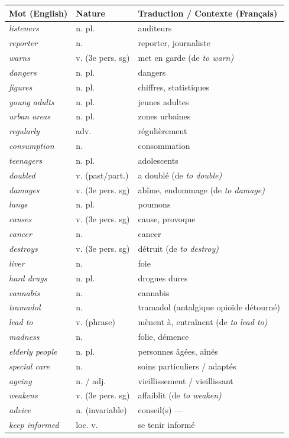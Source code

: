 \documentclass[11pt]{article}
\newcommand{\eng}[1]{\ifmmode\text{\textit{#1}}\else\begingroup\selectlanguage{english}\itshape #1\endgroup\fi}
\begin{document}
\begin{center}
\begin{tabularx}{\linewidth}{|l|l|X|}
\hline
\rowcolor{popblueL} \textbf{Mot (English)} & \textbf{Nature} & \textbf{Traduction / Contexte (Français)} \\
\hline
\eng{listeners} & n. pl. & auditeurs \\
\eng{reporter} & n. & reporter, journaliste \\
\eng{warns} & v. (3e pers. sg) & met en garde (de \eng{to warn}) \\
\eng{dangers} & n. pl. & dangers \\
\eng{figures} & n. pl. & chiffres, statistiques \\
\eng{young adults} & n. pl. & jeunes adultes \\
\eng{urban areas} & n. pl. & zones urbaines \\
\eng{regularly} & adv. & régulièrement \\
\eng{consumption} & n. & consommation \\
\eng{teenagers} & n. pl. & adolescents \\
\eng{doubled} & v. (past/part.) & a doublé (de \eng{to double}) \\
\eng{damages} & v. (3e pers. sg) & abîme, endommage (de \eng{to damage}) \\
\eng{lungs} & n. pl. & poumons \\
\eng{causes} & v. (3e pers. sg) & cause, provoque \\
\eng{cancer} & n. & cancer \\
\eng{destroys} & v. (3e pers. sg) & détruit (de \eng{to destroy}) \\
\eng{liver} & n. & foie \\
\eng{hard drugs} & n. pl. & drogues dures \\
\eng{cannabis} & n. & cannabis \\
\eng{tramadol} & n. & tramadol (antalgique opioïde détourné) \\
\eng{lead to} & v. (phrase) & mènent à, entraînent (de \eng{to lead to}) \\
\eng{madness} & n. & folie, démence \\
\eng{elderly people} & n. pl. & personnes âgées, aînés \\
\eng{special care} & n. & soins particuliers / adaptés \\
\eng{ageing} & n. / adj. & vieillissement / vieillissant \\
\eng{weakens} & v. (3e pers. sg) & affaiblit (de \eng{to weaken}) \\
\eng{advice} & n. (invariable) & conseil(s) — \textbf{jamais \eng{advices}} \\
\eng{keep informed} & loc. v. & se tenir informé \\
\hline
\end{tabularx}
\end{center}
\end{document}
